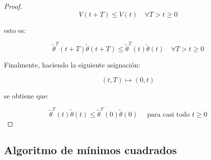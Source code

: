 \begin{proof}
                \begin{equation*}
                    V(t + T) \le V(t) \quad \forall T > t \ge 0
                \end{equation*}

                esto es:

                \begin{equation*}
                    \tilde{\theta}^T(t + T) \tilde{\theta}(t + T) \le \tilde{\theta}^T(t) \tilde{\theta}(t) \quad \forall T > t \ge 0
                \end{equation*}

                Finalmente, haciendo la siguiente asignación:

                \begin{equation*}
                    (t, T) \mapsto (0, t)
                \end{equation*}

                se obtiene que:

                \begin{equation*}
                    \tilde{\theta}^T(t) \tilde{\theta}(t) \le \tilde{\theta}^T(0) \tilde{\theta}(0) \quad \text{ para casi todo } t \ge 0
                \end{equation*}
            \end{proof}


        \subsection{Algoritmo de mínimos cuadrados}
